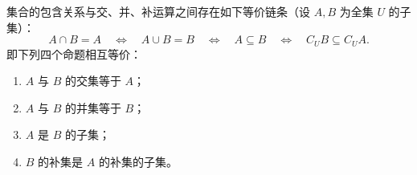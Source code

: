 \begin{statementbox}
集合的包含关系与交、并、补运算之间存在如下等价链条（设 $A,B$ 为全集 $U$ 的子集）：
\[
A\cap B = A \quad\Leftrightarrow\quad A\cup B = B \quad\Leftrightarrow\quad A\subseteq B \quad\Leftrightarrow\quad C_U B \subseteq C_U A.
\]
即下列四个命题相互等价：
\begin{enumerate}
    \item $A$ 与 $B$ 的交集等于 $A$；
    \item $A$ 与 $B$ 的并集等于 $B$；
    \item $A$ 是 $B$ 的子集；
    \item $B$ 的补集是 $A$ 的补集的子集。
\end{enumerate}
\end{statementbox}